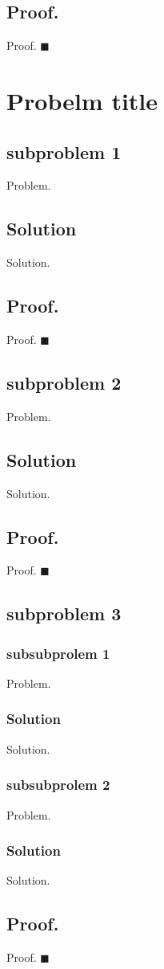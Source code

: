 \documentclass{article}
\begin{document}
 \subsection*{Proof.}
  	Proof.
 $ \blacksquare $
\section*{Probelm title}
\subsection*{subproblem 1}
  Problem.
\subsection*{Solution}
  Solution.
 \subsection*{Proof.}
  Proof.
 $ \blacksquare $
\subsection*{subproblem 2}
  Problem.
\subsection*{Solution}
  Solution.
 \subsection*{Proof.}
  Proof.
 $ \blacksquare $
\subsection*{subproblem 3}
  	\subsubsection*{subsubprolem 1}
  	Problem.
	\subsubsection*{Solution}
  	Solution.
  	\subsubsection*{subsubprolem 2}
  	Problem.
	\subsubsection*{Solution}
  	Solution.
 \subsection*{Proof.}
  	Proof.
 $ \blacksquare $

\end{document}
